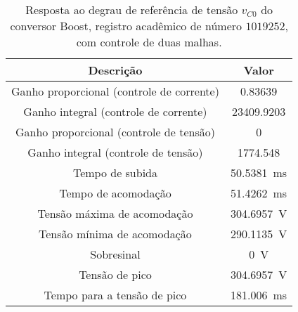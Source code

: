\begin{table}[!ht]
\centering
\caption{Resposta ao degrau de referência de tensão $v_{C0}$ do conversor Boost, registro acadêmico de número $1019252$, com controle de duas malhas.}
\label{tab:resposta2malhas}
\begin{tabular}{@{}cc@{}}
\toprule
\textbf{Descrição} & \textbf{Valor}\\ \midrule
Ganho proporcional (controle de corrente) & \SI{0.83639}{}\\
Ganho integral (controle de corrente) & \SI{23409.9203}{}\\
Ganho proporcional (controle de tensão) & \SI{0}{}\\
Ganho integral (controle de tensão) & \SI{1774.548}{}\\
Tempo de subida & \SI{50.5381}{\milli\s}\\
Tempo de acomodação & \SI{51.4262}{\milli\s}\\
Tensão máxima de acomodação & \SI{304.6957}{\V}\\
Tensão mínima de acomodação & \SI{290.1135}{\V}\\
Sobresinal & \SI{0}{\V}\\
Tensão de pico & \SI{304.6957}{\V}\\
Tempo para a tensão de pico & \SI{181.006}{\milli\s}\\
\bottomrule
\end{tabular}
\end{table}

